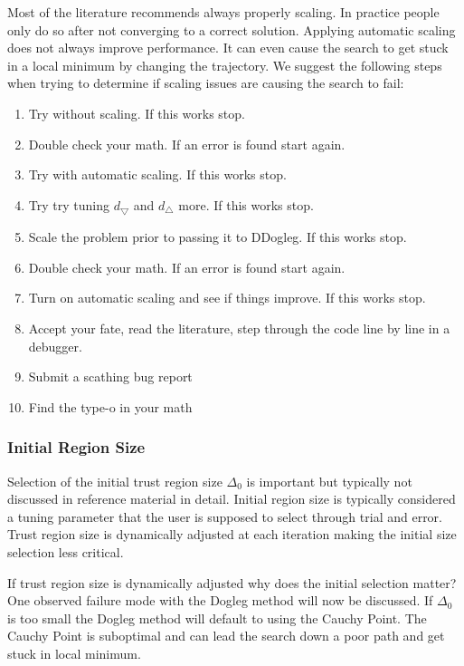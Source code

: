 \documentclass[peerreview,compsoc,onecolumn]{IEEEtran}
\newenvironment{enumargin}[1]{\begin{enumerate}[leftmargin=#1\textwidth , rightmargin=#1\textwidth]}{\end{enumerate}}
\begin{document}
Most of the literature recommends always properly scaling. In practice people only do so after not converging to a correct solution. Applying automatic scaling does not always improve performance. It can even cause the search to get stuck in a local minimum by changing the trajectory. We suggest the following steps when trying to determine if scaling issues are causing the search to fail:
\begin{enumargin}{0.2}
\item Try without scaling. If this works stop.
\item Double check your math. If an error is found start again.
\item Try with automatic scaling. If this works stop.
\item Try try tuning $d_{\bigtriangledown}$ and $d_{\bigtriangleup}$ more. If this works stop.
\item Scale the problem prior to passing it to DDogleg. If this works stop.
\item Double check your math. If an error is found start again.
\item Turn on automatic scaling and see if things improve. If this works stop.
\item Accept your fate, read the literature, step through the code line by line in a debugger.
\item Submit a scathing bug report
\item Find the type-o in your math
\end{enumargin}

\subsubsection{Initial Region Size} 
\label{section:init_region_size}

Selection of the initial trust region size $\Delta_0$ is important but typically not discussed in reference material \cite{fletcher1987,numopt2006,IMM2004} in detail. Initial region size is typically considered a tuning parameter that the user is supposed to select through trial and error. Trust region size is dynamically adjusted at each iteration making the initial size selection less critical. 

If trust region size is dynamically adjusted why does the initial selection matter? One observed failure mode with the Dogleg method will now be discussed. If $\Delta_0$ is too small the Dogleg method will default to using the Cauchy Point. The Cauchy Point is suboptimal and can lead the search down a poor path and get stuck in local minimum. 
\end{document}

